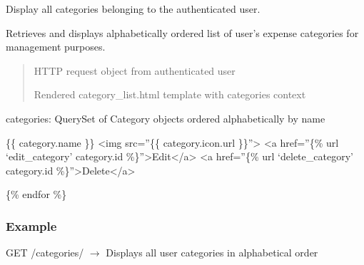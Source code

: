 \documentclass[letterpaper,10pt,english]{sphinxmanual}
\begin{document}
\begin{fulllineitems}
\label{\detokenize{expensesApp:expensesApp.views.category_list}}
\pysigstartsignatures
\pysiglinewithargsret
{}
{}
{}
\pysigstopsignatures
\sphinxAtStartPar
Display all categories belonging to the authenticated user.

\sphinxAtStartPar
Retrieves and displays alphabetically ordered list of user’s
expense categories for management purposes.
\begin{quote}\begin{description}
\sphinxAtStartPar
{} \textendash{} HTTP request object from authenticated user

\sphinxAtStartPar
Rendered category\_list.html template with categories context

\end{description}\end{quote}
\begin{description}
\sphinxAtStartPar
categories: QuerySet of Category objects ordered alphabetically by name

\begin{description}
\sphinxAtStartPar
\{\{ category.name \}\}
\textless{}img src=”\{\{ category.icon.url \}\}”\textgreater{}
\textless{}a href=”\{\% url ‘edit\_category’ category.id \%\}”\textgreater{}Edit\textless{}/a\textgreater{}
\textless{}a href=”\{\% url ‘delete\_category’ category.id \%\}”\textgreater{}Delete\textless{}/a\textgreater{}

\end{description}

\sphinxAtStartPar
\{\% endfor \%\}

\end{description}
\subsubsection*{Example}

\sphinxAtStartPar
GET /categories/ \(\rightarrow\) Displays all user categories in alphabetical order

\end{fulllineitems}

\end{document}
